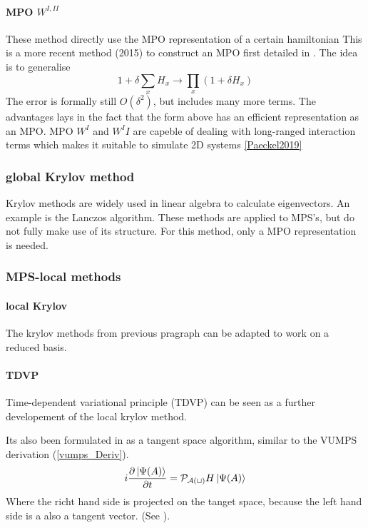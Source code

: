 \paragraph{ MPO $W^{I,II}$}
These method directly use the MPO representation of a certain hamiltonian
This is a more recent method (2015) to construct an MPO first detailed in \cite{Zaletel2015}. The idea is to generalise
\begin{equation}
  1+ \delta \sum_x H_x \rightarrow \prod_x (1+  \delta H_x)
\end{equation}
The error is formally still $O(\delta^2)$, but includes many more terms. The advantages lays in the fact that the form above has an efficient representation as an MPO. MPO $W^I$ and $W^II$ are capeble of dealing with long-ranged interaction terms which makes it suitable to simulate 2D systems \cref{Paeckel2019}

\subsubsection{global Krylov method }

Krylov methods are widely used in linear algebra to calculate eigenvectors. An example is the Lanczos algorithm. These methods are applied to MPS's, but do not fully make use of its structure. For this method, only a MPO representation is needed.


\subsubsection{MPS-local methods }

\paragraph{local Krylov}
The krylov methods from previous pragraph can be adapted to work on a reduced basis.

\paragraph{TDVP} Time-dependent variational principle (TDVP) can be seen as a further developement of the local krylov method.

Its also been formulated in as a tangent space algorithm, similar to the VUMPS derivation (\cref{vumps_Deriv}).
\begin{equation}
  i \frac{\partial \ket{ \Psi( A ) }}{\partial t} = \mathcal{P_{ A( t )} } H  \ket{ \Psi( A ) }
\end{equation}
Where the richt hand side is projected on the tanget space, because the left hand side is a also a tangent vector. (See \cite{Vanderstraeten2019}).
